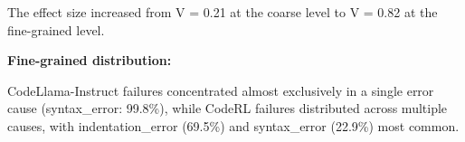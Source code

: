 The effect size increased from V = 0.21 at the coarse level to V = 0.82 at the fine-grained level.

\textbf{Fine-grained distribution:}

\begin{table}[htbp]
\centering
{}
\end{table}

CodeLlama-Instruct failures concentrated almost exclusively in a single error cause (syntax\_error: 99.8\%), while CodeRL failures distributed across multiple causes, with indentation\_error (69.5\%) and syntax\_error (22.9\%) most common.
